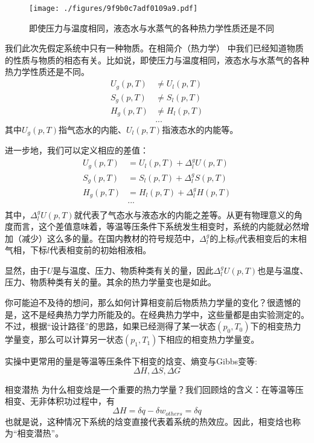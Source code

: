 
\begin{issues}
\issueDraft
{}
\end{issues}


\begin{figure}[ht]
\centering
\texttt{[image: ./figures/9f9b0c7adf0109a9.pdf]}
\caption{即使压力与温度相同，液态水与水蒸气的各种热力学性质还是不同} \label{fig_PTTVC2_1}
\end{figure}

我们此次先假定系统中只有一种物质。在相简介（热力学） 中我们已经知道物质的性质与物质的相态有关。比如说，即使压力与温度相同，液态水与水蒸气的各种热力学性质还是不同。
$$
\begin{aligned}
U_g(p,T) &\ne U_l(p,T)\\
S_g(p,T) &\ne S_l(p,T)\\
H_g(p,T) &\ne H_l(p,T)\\
&...
\end{aligned}
$$
其中$U_g(p,T)$指气态水的内能、$U_l(p,T)$指液态水的内能等。

进一步地，我们可以定义相应的差值：
$$
\begin{aligned}
U_g(p,T) &= U_l(p,T) + \Delta ^ g_l U (p,T)\\
S_g(p,T) &= S_l(p,T) + \Delta ^ g_l S (p,T)\\
H_g(p,T) &= H_l(p,T) + \Delta ^ g_l H (p,T)\\
&...\\
\end{aligned}
$$
其中，$\Delta ^ g_l U (p,T)$就代表了气态水与液态水的内能之差等。从更有物理意义的角度而言，这个差值意味着，等温等压条件下系统发生相变时，系统的内能就必然增加（减少）这么多的量。在国内教材的符号规范中，$\Delta^g_l$的上标$g$代表相变后的末相气相，下标$l$代表相变前的初始相液相。

显然，由于$U$是与温度、压力、物质种类有关的量，因此$\Delta ^ g_l U (p,T)$也是与温度、压力、物质种类有关的量。其余的热力学量变也是如此。

你可能迫不及待的想问，那么如何计算相变前后物质热力学量的变化？很遗憾的是，这不是经典热力学力所能及的。在经典热力学中，这些量都是由实验测定的。不过，根据“设计路径”的思路，如果已经测得了某一状态$(p_0,T_0)$下的相变热力学量变，那么可以计算另一状态$(p_1,T_1)$下相应的相变热力学量变。

实操中更常用的量是等温等压条件下相变的焓变、熵变与Gibbs变等:
$$
\Delta H, \Delta  S, \Delta G
$$

\begin{example}{相变潜热}
为什么相变焓是一个重要的热力学量？我们回顾焓的含义：在等温等压相变、无非体积功过程中，有
$$
\Delta H = \delta q - \delta w_{others} = \delta q
$$
也就是说，这种情况下系统的焓变直接代表着系统的热效应。因此，相变焓也称为“相变潜热”。
\end{example}

